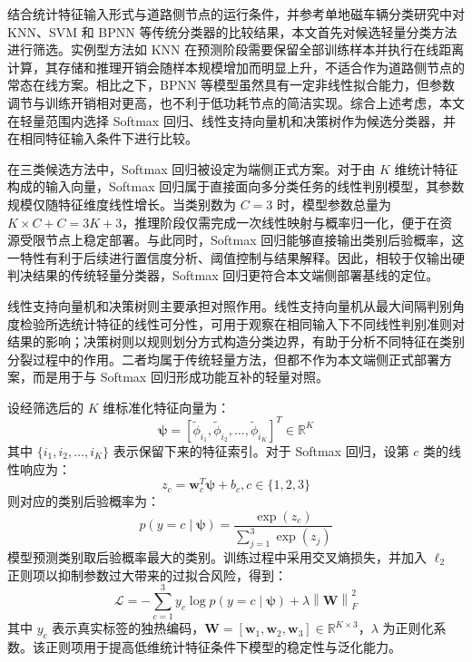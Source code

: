 \documentclass{xdupgthesis}
\begin{document}
结合统计特征输入形式与道路侧节点的运行条件，并参考单地磁车辆分类研究中对 KNN、SVM 和 BPNN 等传统分类器的比较结果\cite{ch3_xu2018imbalanced}，本文首先对候选轻量分类方法进行筛选。实例型方法如 KNN 在预测阶段需要保留全部训练样本并执行在线距离计算，其存储和推理开销会随样本规模增加而明显上升，不适合作为道路侧节点的常态在线方案。相比之下，BPNN 等模型虽然具有一定非线性拟合能力，但参数调节与训练开销相对更高，也不利于低功耗节点的简洁实现。综合上述考虑，本文在轻量范围内选择 Softmax 回归、线性支持向量机和决策树作为候选分类器，并在相同特征输入条件下进行比较。

在三类候选方法中，Softmax 回归被设定为端侧正式方案。对于由 $K$ 维统计特征构成的输入向量，Softmax 回归属于直接面向多分类任务的线性判别模型，其参数规模仅随特征维度线性增长。当类别数为 $C=3$ 时，模型参数总量为 $K\times C+C=3K+3$，推理阶段仅需完成一次线性映射与概率归一化，便于在资源受限节点上稳定部署。与此同时，Softmax 回归能够直接输出类别后验概率，这一特性有利于后续进行置信度分析、阈值控制与结果解释。因此，相较于仅输出硬判决结果的传统轻量分类器，Softmax 回归更符合本文端侧部署基线的定位。

线性支持向量机和决策树则主要承担对照作用。线性支持向量机从最大间隔判别角度检验所选统计特征的线性可分性，可用于观察在相同输入下不同线性判别准则对结果的影响；决策树则以规则划分方式构造分类边界，有助于分析不同特征在类别分裂过程中的作用。二者均属于传统轻量方法，但都不作为本文端侧正式部署方案，而是用于与 Softmax 回归形成功能互补的轻量对照。

设经筛选后的 $K$ 维标准化特征向量为：
\begin{equation}
\label{eq:ch3_edge_selected_feat}
    \boldsymbol{\psi}=
    [\tilde{\phi}_{i_1},\tilde{\phi}_{i_2},\ldots,\tilde{\phi}_{i_K}]^T
    \in\mathbb{R}^{K}
\end{equation}
其中 $\{i_1,i_2,\ldots,i_K\}$ 表示保留下来的特征索引。对于 Softmax 回归，设第 $c$ 类的线性响应为：
\begin{equation}
    z_c=\mathbf{w}_c^T\boldsymbol{\psi}+b_c, c\in\{1,2,3\}
\end{equation}
则对应的类别后验概率为：
\begin{equation}
    p(y=c\mid \boldsymbol{\psi})=\frac{\exp(z_c)}{\sum_{j=1}^{3}\exp(z_j)}
\end{equation}
模型预测类别取后验概率最大的类别。训练过程中采用交叉熵损失，并加入 $\ell_2$ 正则项以抑制参数过大带来的过拟合风险，得到：
\begin{equation}
    \mathcal{L}=-\sum_{c=1}^{3} y_c\log p(y=c\mid \boldsymbol{\psi})
    +\lambda\left\|\mathbf{W}\right\|_F^2
\end{equation}
其中 $y_c$ 表示真实标签的独热编码，$\mathbf{W}=[\mathbf{w}_1,\mathbf{w}_2,\mathbf{w}_3]\in\mathbb{R}^{K\times 3}$，$\lambda$ 为正则化系数。该正则项用于提高低维统计特征条件下模型的稳定性与泛化能力。
\end{document}
